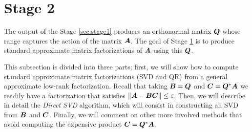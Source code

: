 \begin{figure}[ht]
\begin{center}
\end{center}
\end{figure}



\section{Stage 2} \label{sec:stage2}
 The output of the Stage \ref{sec:stage1} produces an orthonormal matrix $\bm{Q}$ whose
 range captures the action of the matrix $\bm{A}$. The goal of Stage
 \ref{sec:stage2} is 
 to produce standard approximate matrix factorizations of $\bm{A}$
 using this $\bm{Q}$.

This subsection is divided into three parts; first, we will show how to compute
standard approximate matrix factorizations (SVD and QR) from a general 
approximate low-rank factorization. Recall that taking $\bm{B}=\bm{Q}$
and $\bm{C}=\bm{Q}^*\bm{A}$ we readily have a factorization that
satisfies $\|\bm{A}-\bm{B}\bm{C}\|\leq\varepsilon$.
Then, we will describe in detail the \textit{Direct SVD} algorithm, which will
consist in constructing an SVD from $\bm{B}$ and $\bm{C}$. Finally, we will
comment on other more involved methods that avoid computing the expensive
product $\bm{C}=\bm{Q}^*\bm{A}$.

